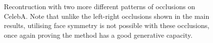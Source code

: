 \begin{figure}
    \centering
     \\
     \\
     \caption{Recontruction with two more different patterns of occlusions on CelebA. Note that unlike the left-right occlusions shown in the main results, utilising face symmetry is not possible with these occlusions, once again proving the method has a good generative capacity.}
    \label{fig:celeb_a_inpainting}
\end{figure}